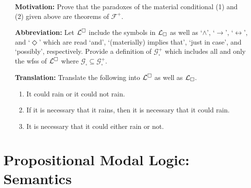 \documentclass[a4paper, 11pt]{article} %
\begin{document}
\begin{enumerate}[leftmargin=1.2in,labelsep=.15in] 
\item[\bf Motivation:] Prove that the paradoxes of the material conditional (1) and (2) given above are theorems of $\mathcal{F}^+$.
\item[\bf Abbreviation:] Let $\mathcal{L}^{\square}$ include the symbols in $\mathcal{L}_\square$ as well as `$\wedge$', `$\rightarrow$', `$\leftrightarrow$', and `$\Diamond$' which are read `and', `(materially) implies that', `just in case', and `possibly', respectively. Provide a definition of $\mathcal{G}_\square^+$ which includes all and only the wfss of $\mathcal{L}^{\square}$ where $\mathcal{G}_\square\subseteq\mathcal{G}_\square^+$.
\item[\bf Translation:] Translate the following into $\mathcal{L}^{\square}$ as well as $\mathcal{L}_\square$.
	\begin{enumerate}[label=(\arabic*)]\small
	\item It could rain or it could not rain.
	\item If it is necessary that it rains, then it is necessary that it could rain.
	\item It is necessary that it could either rain or not.
	\end{enumerate}
\end{enumerate}



\section*{\sc Propositional Modal Logic: Semantics}
\end{document}
